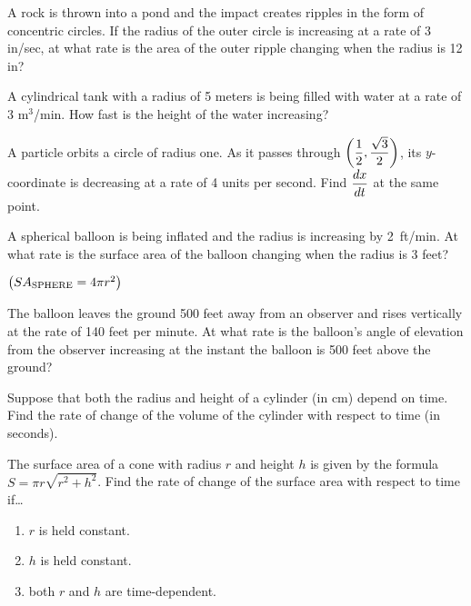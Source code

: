 \documentclass[12pt]{article}
\begin{document}
\newpage

\Example A rock is thrown into a pond and the impact creates ripples in the form of concentric circles. If the radius of the outer circle is increasing at a rate of 3 in/sec, at what rate is the area of the outer ripple changing when the radius is 12 in?

\vspace{100mm}

\Example A cylindrical tank with a radius of 5 meters is being filled with water at a rate of 3 m$^3$/min. How fast is the height of the water increasing?

\newpage 

\Example A particle orbits a circle of radius one. As it passes through $\displaystyle\left(\frac{1}{2},\frac{\sqrt{3}}{2}\right)$, its $y$-coordinate is decreasing at a rate of 4 units per second. Find $\displaystyle\frac{dx}{dt}$ at the same point.

\vspace{100mm}

\Example A spherical balloon is being inflated and the radius is increasing by 2~ft/min. At what rate is the surface area of the balloon changing when the radius is 3 feet? 

$\left( SA_{\text{SPHERE}}=4\pi r^2\right)$

\newpage

\Example The balloon leaves the ground 500 feet away from an observer and rises vertically at the rate of 140 feet per minute. At what rate is the balloon's angle of elevation from the observer increasing at the instant the balloon is 500 feet above the ground?

\vspace{100mm}

\Example Suppose that both the radius and height of a cylinder (in cm) depend on time. Find the rate of change of the volume of the cylinder with respect to time (in seconds). 

\newpage

\Example The surface area of a cone with radius $r$ and height $h$ is given by the formula $S=\pi r\sqrt{r^2+h^2}$. Find the rate of change of the surface area with respect to time if\dots

\begin{enumerate}
\item[\tc{a}] $r$ is held constant.

\vspace{50mm}

\item[\tc{b}] $h$ is held constant.

\vspace{50mm}

\item[\tc{c}] both $r$ and $h$ are time-dependent.

\end{enumerate}
\end{document}
